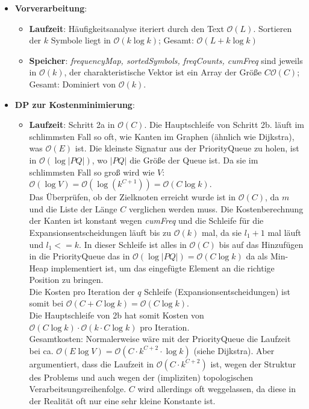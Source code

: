 \documentclass[a4paper,10pt,ngerman]{scrartcl}
\begin{document}
\begin{itemize}
  \item \textbf{Vorverarbeitung}:
  \begin{itemize}
    \item \textbf{Laufzeit}:
      Häufigkeitsanalyse iteriert durch den Text $\mathcal{O}(L)$. Sortieren der $k$ Symbole liegt in $\mathcal{O}(k \log k)$; Gesamt: $\mathcal{O}(L + k \log k)$
    \item \textbf{Speicher}: \textit{frequencyMap, sortedSymbols, freqCounts, cumFreq} sind jeweils in $\mathcal{O}(k)$, der charakteristische Vektor ist ein Array der Größe $C \mathcal{O}(C)$; Gesamt: Dominiert von $\mathcal{O}(k)$.
  \end{itemize}
  \item \textbf{DP zur Kostenminimierung}:
  \begin{itemize}
    \item \textbf{Laufzeit}: Schritt 2a in $\mathcal{O}(C)$. Die Hauptschleife von Schritt 2b. läuft im schlimmsten Fall so oft, wie Kanten im Graphen (ähnlich wie Dijkstra), was $\mathcal{O}(E)$ ist. Die kleinste Signatur aus der PriorityQueue zu holen, ist in $\mathcal{O}(\log |PQ|)$, wo $|PQ|$ die Größe der Queue ist. Da sie im schlimmsten Fall so groß wird wie $V$: $\mathcal{O}(\log V) = \mathcal{O}(\log (k^{C+1})) = \mathcal{O}(C\log k)$.\\
    Das Überprüfen, ob der Zielknoten erreicht wurde ist in $\mathcal{O}(C)$, da $m$ und die Liste der Länge $C$ verglichen werden muss. Die Kostenberechnung der Kanten ist konstant wegen \textit{cumFreq} und die Schleife für die Expansionsentscheidungen läuft bis zu $\mathcal{O}(k)$ mal, da sie $l_1 + 1$  mal läuft und $l_1 <=k$. In dieser Schleife ist alles in $\mathcal{O}(C)$ bis auf das Hinzufügen in die PriorityQueue das in $\mathcal{O}(\log |PQ|) = \mathcal{O}(C\log k)$ da als Min-Heap implementiert ist, um das eingefügte Element an die richtige Position zu bringen. \\
    Die Kosten pro Iteration der $q$ Schleife (Expansionsentscheidungen) ist somit bei $\mathcal{O}(C+ C\log k)=\mathcal{O}(C\log k)$.\\
    Die Hauptschleife von 2b hat somit Kosten von $\mathcal{O}(C\log k) \cdot \mathcal{O}(k \cdot C \log k)$ pro Iteration.\\
    Gesamtkosten: Normalerweise wäre mit der PriorityQueue die Laufzeit bei ca. $\mathcal{O}(E \log V) = \mathcal{O}(C\cdot k^{C+2}\cdot \log k)$ (siehe Dijkstra). Aber \cite[Richtung Ende Kapitel 4]{papergolinrote} argumentiert, dass die Laufzeit in $\mathcal{O}(C\cdot k^{C+2})$ ist, wegen der Struktur des Problems und auch wegen der (impliziten) topologischen Verarbeitsungsreihenfolge. $C$ wird allerdings oft weggelassen, da diese in der Realität oft nur eine sehr kleine Konstante ist.

\end{itemize}
\end{itemize}
\end{document}
